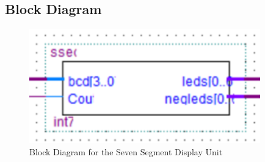 \subsection{{Block Diagram}}

	\begin{figure}[H]
    		\centering
    		\includegraphics[width=10cm]{Pictures/SSEG.png}
    		\caption{{Block Diagram for the Seven Segment Display Unit}}
    		\label{}
	\end{figure}


	{}

